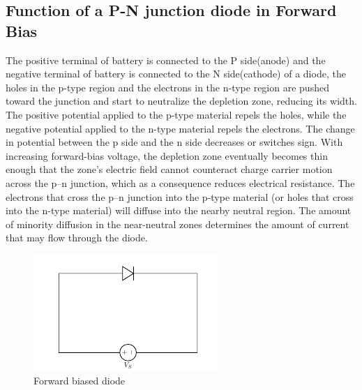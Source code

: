		\subsection{Function of a P-N junction diode in Forward Bias}
			The positive terminal of battery is connected to the P side(anode) and the negative terminal of battery is connected to the N side(cathode) of a diode, the holes in the p-type region and the electrons in the n-type region are pushed toward the junction and start to neutralize the depletion zone, reducing its width. The positive potential applied to the p-type material repels the holes, while the negative potential applied to the n-type material repels the electrons. The change in potential between the p side and the n side decreases or switches sign. With increasing forward-bias voltage, the depletion zone eventually becomes thin enough that the zone's electric field cannot counteract charge carrier motion across the p–n junction, which as a consequence reduces electrical resistance. The electrons that cross the p–n junction into the p-type material (or holes that cross into the n-type material) will diffuse into the nearby neutral region. The amount of minority diffusion in the near-neutral zones determines the amount of current that may flow through the diode.
			
			\begin{figure}[h]
				\centering
				\includegraphics[width=0.3\linewidth]{img/exp5/3}
				\caption{Forward biased diode}
				\label{fig:pnjf}
			\end{figure}
		
